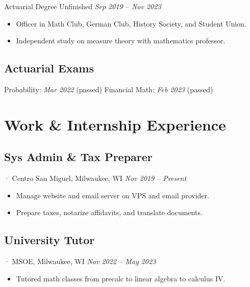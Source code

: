 \documentclass[12pt]{article}
\newcommand{\itemspace}[0]{
  \vspace{0.3170em}
}
\begin{document}
Actuarial Degree Unfinished \hfill \textit{Sep 2019 -- Nov 2023}

\begin{itemize}[noitemsep,nolistsep]
  \item Officer in Math Club, German Club, History Society, and Student Union.

  \item Independent study on measure theory with mathematics professor.
\end{itemize}

\itemspace

\subsection{Actuarial Exams} \hfill

Probability:\; \textit{Mar 2022} (passed)
\hfill
Financial Math:\; \textit{Feb 2023} (passed)

\itemspace

\section{Work \& Internship Experience}

\subsection{Sys Admin \& Tax Preparer}
· Centro San Miguel, Milwaukee, WI \hfill \textit{Nov 2019 -- Present}

\begin{itemize}[noitemsep,nolistsep]
  \item Manage website and email server on VPS and email provider.

  \item Prepare taxes, notarize affidavits, and translate documents.
\end{itemize}

\itemspace

\subsection{University Tutor}
· MSOE, Milwaukee, WI \hfill \textit{Nov 2022 -- May 2023}

\begin{itemize}[noitemsep,nolistsep]
  \item Tutored math classes from precalc to linear algebra to calculus IV.
\end{itemize}
\end{document}
